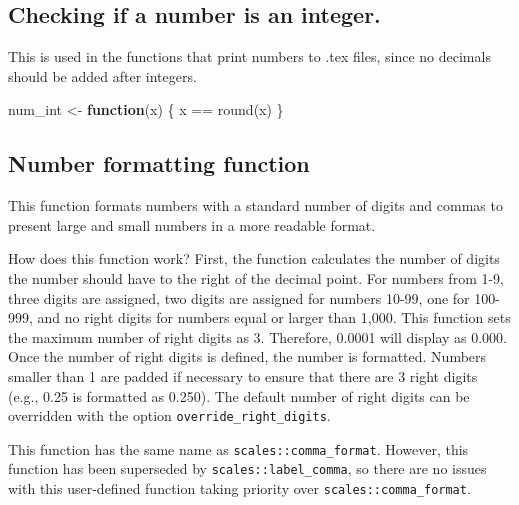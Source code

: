\documentclass[
]{book}
\newenvironment{Shaded}{\begin{snugshade}}{\end{snugshade}}
\newcommand{\ControlFlowTok}[1]{\textcolor[rgb]{0.13,0.29,0.53}{\textbf{#1}}}
\newcommand{\FunctionTok}[1]{\textcolor[rgb]{0.00,0.00,0.00}{#1}}
\newcommand{\NormalTok}[1]{#1}
\newcommand{\OtherTok}[1]{\textcolor[rgb]{0.56,0.35,0.01}{#1}}
\newcommand{\SpecialCharTok}[1]{\textcolor[rgb]{0.00,0.00,0.00}{#1}}
\begin{document}
\hypertarget{checking-if-a-number-is-an-integer.}{%
\subsection{Checking if a number is an integer.}\label{checking-if-a-number-is-an-integer.}}

This is used in the functions that print numbers to .tex files, since no decimals should be added after integers.

\begin{Shaded}
\begin{Highlighting}[]
\NormalTok{num\_int }\OtherTok{\textless{}{-}} \ControlFlowTok{function}\NormalTok{(x) \{}
\NormalTok{  x }\SpecialCharTok{==} \FunctionTok{round}\NormalTok{(x)}
\NormalTok{\}}
\end{Highlighting}
\end{Shaded}

\hypertarget{number-formatting-function}{%
\subsection{Number formatting function}\label{number-formatting-function}}

This function formats numbers with a standard number of digits and commas to present large and small numbers in a more readable format.

How does this function work? First, the function calculates the number of digits the number should have to the right of the decimal point. For numbers from 1-9, three digits are assigned, two digits are assigned for numbers 10-99, one for 100-999, and no right digits for numbers equal or larger than 1,000. This function sets the maximum number of right digits as 3. Therefore, 0.0001 will display as 0.000. Once the number of right digits is defined, the number is formatted. Numbers smaller than 1 are padded if necessary to ensure that there are 3 right digits (e.g., 0.25 is formatted as 0.250). The default number of right digits can be overridden with the option \texttt{override\_right\_digits}.

This function has the same name as \texttt{scales::comma\_format}. However, this function has been superseded by \texttt{scales::label\_comma}, so there are no issues with this user-defined function taking priority over \texttt{scales::comma\_format}.
\end{document}
